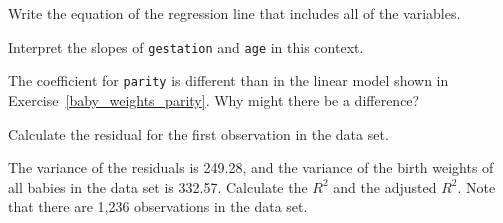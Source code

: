 {\begin{center}
\end{center}
\begin{parts}
\item Write the equation of the regression line that includes all of the 
variables.
\item Interpret the slopes of \texttt{gestation} and \texttt{age} in this 
context.
\item The coefficient for \texttt{parity} is different than in the linear 
model shown in Exercise~\ref{baby_weights_parity}. Why might there be a 
difference?
\item Calculate the residual for the first observation in the data set.
\item The variance of the residuals is 249.28, and the variance of the birth 
weights of all babies in the data set is 332.57. Calculate the $R^2$ and the 
adjusted $R^2$. Note that there are 1,236 observations in the data set.
\end{parts}
}{}

\textC{\newpage}


